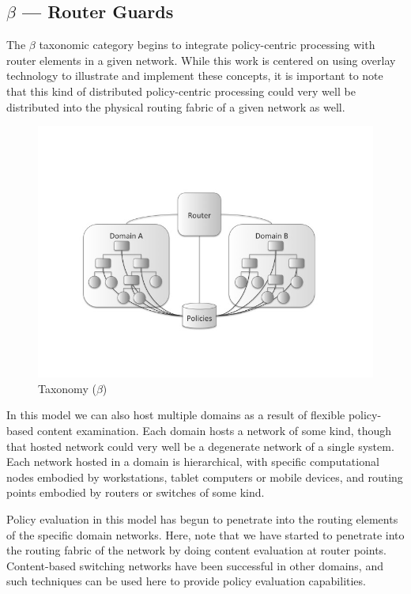 \documentclass[12pt,letterpaper]{article}
\begin{document}
\subsection{$\beta$ --- Router Guards}
The $\beta$ taxonomic category begins to integrate policy-centric processing with router elements in a given network.  While this work is centered on using overlay technology to illustrate and implement these concepts, it is important to note that this kind of distributed policy-centric processing could very well be distributed into the physical routing fabric of a given network as well.

\begin{figure}[!t]
\centering
\includegraphics[width=5in]{model-beta}
\caption{Taxonomy ($\beta$)}
\label{fig:model:taxonomy-beta}
\end{figure}

In this model we can also host multiple domains as a result of flexible policy-based content examination.  Each domain hosts a network of some kind, though that hosted network could very well be a degenerate network of a single system.  Each network hosted in a domain is hierarchical, with specific computational nodes embodied by workstations, tablet computers or mobile devices, and routing points embodied by routers or switches of some kind.

Policy evaluation in this model has begun to penetrate into the routing elements of the specific domain networks.  Here, note that we have started to penetrate into the routing fabric of the network by doing content evaluation at router points.  Content-based switching networks have been successful in other domains, and such techniques can be used here to provide policy evaluation capabilities.  
\end{document}
